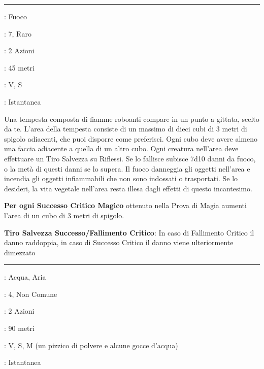 \begin{multicols}{2}

\smallskip\noindent\rule{\linewidth}{2pt} \hypertarget{Tempesta di Fuoco}{}\smallskip{}
\noindent
\begin{description}[noitemsep, topsep=0pt, parsep=0pt, partopsep=0pt, leftmargin=0cm, labelwidth=2.8cm]
	\item[\textbf{Lista di Magia}]: Fuoco
	\item[\textbf{Livello}]: 7, Raro
	\item[\textbf{T. di Lancio}]: 2 Azioni
	\item[\textbf{Gittata}]: 45 metri
	\item[\textbf{Componenti}]: V, S
	\item[\textbf{Durata}]: Istantanea
\end{description}

Una tempesta composta di fiamme roboanti compare in un punto a gittata, scelto da te. L'area della tempesta consiste di un massimo di dieci cubi di 3 metri di spigolo adiacenti, che puoi disporre come preferisci. Ogni cubo deve avere almeno una faccia adiacente a quella di un altro cubo. Ogni creatura nell'area deve effettuare un Tiro Salvezza su Riflessi. Se lo fallisce subisce 7d10 danni da fuoco, o la metà di questi danni se lo supera. Il fuoco danneggia gli oggetti nell'area e incendia gli oggetti infiammabili che non sono indossati o trasportati. Se lo desideri, la vita vegetale nell'area resta illesa dagli effetti di questo incantesimo.

\textbf{Per ogni Successo Critico Magico} ottenuto nella Prova di Magia aumenti l'area di un cubo di 3 metri di spigolo.

\textbf{Tiro Salvezza Successo/Fallimento Critico}: In caso di Fallimento Critico il danno raddoppia, in caso di Successo Critico il danno viene ulteriormente dimezzato

\smallskip\noindent\rule{\linewidth}{2pt} \hypertarget{Tempesta di Ghiaccio}{}\smallskip{}
\noindent
\begin{description}[noitemsep, topsep=0pt, parsep=0pt, partopsep=0pt, leftmargin=0cm, labelwidth=2.8cm]
	\item[\textbf{Lista di Magia}]: Acqua, Aria
	\item[\textbf{Livello}]: 4, Non Comune
	\item[\textbf{T. di Lancio}]: 2 Azioni
	\item[\textbf{Gittata}]: 90 metri
	\item[\textbf{Componenti}]: V, S, M (un pizzico di polvere e alcune gocce d'acqua)
	\item[\textbf{Durata}]: Istantanea
\end{description}


\end{multicols}
